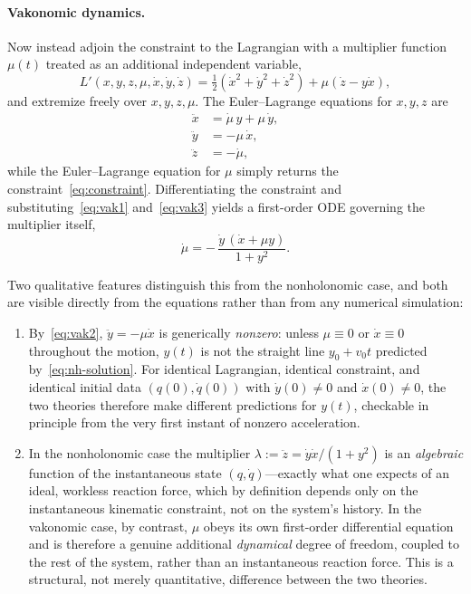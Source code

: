 \documentclass[11pt]{article}
\begin{document}
\paragraph{Vakonomic dynamics.}
Now instead adjoin the constraint to the Lagrangian with a multiplier function $\mu(t)$ treated as an additional independent variable,
\begin{equation}
L'(x,y,z,\mu,\dot x,\dot y,\dot z) = \tfrac12(\dot x^2+\dot y^2+\dot z^2) + \mu(\dot z - y\dot x),
\end{equation}
and extremize freely over $x,y,z,\mu$. The Euler--Lagrange equations for $x,y,z$ are
\begin{align}
\ddot x &= \dot\mu\, y + \mu\,\dot y, \label{eq:vak1}\\
\ddot y &= -\mu\,\dot x, \label{eq:vak2}\\
\ddot z &= -\dot\mu, \label{eq:vak3}
\end{align}
while the Euler--Lagrange equation for $\mu$ simply returns the constraint~\eqref{eq:constraint}. Differentiating the constraint and substituting~\eqref{eq:vak1} and~\eqref{eq:vak3} yields a first-order ODE governing the multiplier itself,
\begin{equation}
\dot\mu = -\,\frac{\dot y\,(\dot x + \mu y)}{1+y^2} .
\end{equation}

Two qualitative features distinguish this from the nonholonomic case, and both are visible directly from the equations rather than from any numerical simulation:

\begin{enumerate}[leftmargin=1.6em]
\item By~\eqref{eq:vak2}, $\ddot y = -\mu\dot x$ is generically \emph{nonzero}: unless $\mu\equiv 0$ or $\dot x \equiv 0$ throughout the motion, $y(t)$ is not the straight line $y_0+v_0t$ predicted by~\eqref{eq:nh-solution}. For identical Lagrangian, identical constraint, and identical initial data $(q(0),\dot q(0))$ with $\dot y(0)\neq 0$ and $\dot x(0)\ne0$, the two theories therefore make different predictions for $y(t)$, checkable in principle from the very first instant of nonzero acceleration.
\item In the nonholonomic case the multiplier $\lambda := \ddot z = \dot y \dot x/(1+y^2)$ is an \emph{algebraic} function of the instantaneous state $(q,\dot q)$---exactly what one expects of an ideal, workless reaction force, which by definition depends only on the instantaneous kinematic constraint, not on the system's history. In the vakonomic case, by contrast, $\mu$ obeys its own first-order differential equation and is therefore a genuine additional \emph{dynamical} degree of freedom, coupled to the rest of the system, rather than an instantaneous reaction force. This is a structural, not merely quantitative, difference between the two theories.
\end{enumerate}
\end{document}
